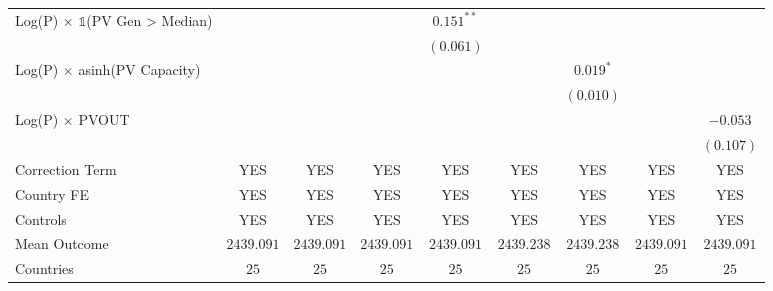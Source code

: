 \begin{table}[htbp]
\begin{center}
\begin{tabular}{l c c c c c c c c}
Log(P) $\times$ $\mathds{1}$(PV Gen > Median)             &                &                &                & $0.151^{**}$   &                &                &                &               \\
                                                          &                &                &                & $(0.061)$      &                &                &                &               \\
Log(P) $\times$ asinh(PV Capacity)                        &                &                &                &                &                & $0.019^{*}$    &                &               \\
                                                          &                &                &                &                &                & $(0.010)$      &                &               \\
Log(P) $\times$ PVOUT                                     &                &                &                &                &                &                &                & $-0.053$      \\
                                                          &                &                &                &                &                &                &                & $(0.107)$     \\
\hline
Correction Term                                           & YES            & YES            & YES            & YES            & YES            & YES            & YES            & YES           \\
Country FE                                                & YES            & YES            & YES            & YES            & YES            & YES            & YES            & YES           \\
Controls                                                  & YES            & YES            & YES            & YES            & YES            & YES            & YES            & YES           \\
Mean Outcome                                              & $2439.091$     & $2439.091$     & $2439.091$     & $2439.091$     & $2439.238$     & $2439.238$     & $2439.091$     & $2439.091$    \\
Countries                                                 & $25$           & $25$           & $25$           & $25$           & $25$           & $25$           & $25$           & $25$          \\

\end{tabular}
\end{center}
\end{table}
